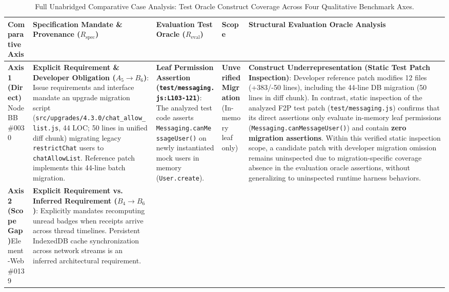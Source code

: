 \begin{table}[t]
\centering
\footnotesize
\caption{Full Unabridged Comparative Case Analysis: Test Oracle Construct Coverage Across Four Qualitative Benchmark Axes.}
\label{tab:comparative_cases_full}
\begin{tabularx}{\textwidth}{p{2.0cm} p{3.2cm} p{2.8cm} p{2.0cm} X}
\toprule
\textbf{Comparative Axis} & \textbf{Specification Mandate \& Provenance ($R_{\text{spec}}$)} & \textbf{Evaluation Test Oracle ($R_{\text{eval}}$)} & \textbf{Scope} & \textbf{Structural Evaluation Oracle Analysis} \\
\midrule
\textbf{Axis 1 (Direct)}\newline NodeBB \#0030 & 
\textbf{Explicit Requirement \& Developer Obligation ($A_5 \rightarrow B_6$)}:\newline
Issue requirements and interface mandate an upgrade migration script (\texttt{src/upgrades/4.3.0/chat\_allow\_list.js}, 44 LOC; 50 lines in unified diff chunk) migrating legacy \texttt{restrictChat} users to \texttt{chatAllowList}. Reference patch implements this 44-line batch migration. & 
\textbf{Leaf Permission Assertion (\texttt{test/messaging.js:L103-121})}:\newline
The analyzed test code asserts \texttt{Messaging.canMessageUser()} on newly instantiated mock users in memory (\texttt{User.create}). & 
\textbf{Unverified Migration}\newline (In-memory leaf only) & 
\textbf{Construct Underrepresentation (Static Test Patch Inspection)}:\newline
Developer reference patch modifies 12 files (+383/-50 lines), including the 44-line DB migration (50 lines in diff chunk). In contrast, static inspection of the analyzed F2P test patch (\texttt{test/messaging.js}) confirms that its direct assertions only evaluate in-memory leaf permissions (\texttt{Messaging.canMessageUser()}) and contain \textbf{zero migration assertions}. Within this verified static inspection scope, a candidate patch with developer migration omission remains uninspected due to migration-specific coverage absence in the evaluation oracle assertions, without generalizing to uninspected runtime harness behaviors. \\
\midrule
\textbf{Axis 2 (Scope Gap)}\newline Element-Web \#0139 & 
\textbf{Explicit Requirement vs. Inferred Requirement ($B_4 \rightarrow B_6$)}:\newline
Explicitly mandates recomputing unread badges when receipts arrive across thread timelines. Persistent IndexedDB cache synchronization across network streams is an inferred architectural requirement. & 

\end{tabularx}
\end{table}
